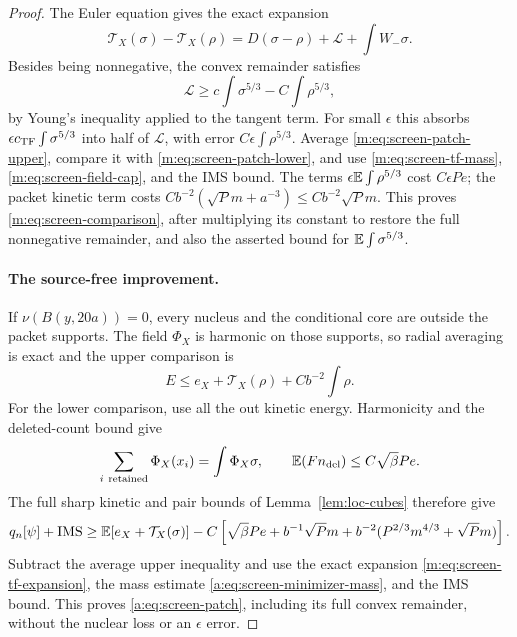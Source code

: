\begin{proof}
The Euler equation gives the exact expansion
\begin{equation}\label{m:eq:screen-tf-expansion}
 \mathcal T_X(\sigma)-\mathcal T_X(\rho)
       =D(\sigma-\rho)+\mathcal L+\int W_-\sigma.
\end{equation}
Besides being nonnegative, the convex remainder satisfies
\[
 \mathcal L\ge c\int\sigma^{5/3}-C\int\rho^{5/3},
\]
by Young's inequality applied to the tangent term.  For small
$\epsilon$ this absorbs $\epsilon c_{\mathrm{TF}}\int\sigma^{5/3}$ into half
of $\mathcal L$, with error $C\epsilon\int\rho^{5/3}$.
Average \eqref{m:eq:screen-patch-upper}, compare it with
\eqref{m:eq:screen-patch-lower}, and use
\eqref{m:eq:screen-tf-mass}, \eqref{m:eq:screen-field-cap}, and the IMS
bound.  The terms $\epsilon\mathbb E\int\rho^{5/3}$ cost $C\epsilon Pe$;
the packet kinetic term costs
$Cb^{-2}(\sqrt Pm+a^{-3})\le Cb^{-2}\sqrt Pm$.
This proves \eqref{m:eq:screen-comparison}, after multiplying its
constant to restore the full nonnegative remainder, and also the
asserted bound for $\mathbb E\int\sigma^{5/3}$.

\paragraph{The source-free improvement.}
If $\nu(B(y,20a))=0$, every nucleus and the conditional core are
outside the packet supports.  The field $\Phi_X$ is harmonic on
those supports, so radial averaging is exact and the upper comparison
is
\begin{equation}\label{a:eq:screen-upper}
 E\le e_X+\mathcal T_X(\rho)+Cb^{-2}\int\rho.
\end{equation}
For the lower comparison, use all the out kinetic energy.
Harmonicity and the deleted-count bound give
\[
 \sum_{i\ \mathrm{retained}}\Phi_X(x_i)=\int\Phi_X\sigma,
 \qquad \E(Fn_{\rm del})\le C\sqrt\beta Pe.
\]
The full sharp kinetic
and pair bounds of Lemma~\ref{lem:loc-cubes} therefore give
\begin{equation}\label{a:eq:screen-lower}
 q_n[\psi]+\mathrm{IMS}
 \ge\mathbb E[e_X+\mathcal T_X(\sigma)]
 -C\left[\sqrt\beta Pe+b^{-1}\sqrt Pm
       +b^{-2}(P^{2/3}m^{4/3}+\sqrt Pm)\right].
\end{equation}
Subtract the average upper inequality and use the exact expansion
\eqref{m:eq:screen-tf-expansion}, the mass estimate
\eqref{a:eq:screen-minimizer-mass}, and the IMS bound.  This proves
\eqref{a:eq:screen-patch}, including its full convex remainder,
without the nuclear loss or an $\epsilon$ error.


\end{proof}
